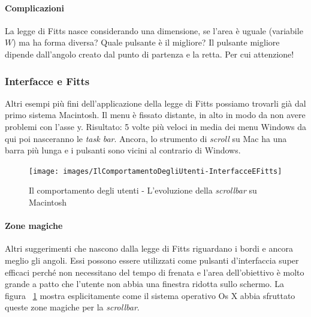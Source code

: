 				\paragraph{Complicazioni}
					La legge di Fitts nasce considerando una dimensione, se l'area è uguale (variabile $W$) ma ha forma diversa? Quale pulsante è il migliore? Il pulsante migliore dipende dall'angolo creato dal punto di partenza e la retta. Per cui attenzione!
					
			\subsubsection{Interfacce e Fitts}
				Altri esempi più fini dell'applicazione della legge di Fitts possiamo trovarli già dal primo sistema Macintosh. Il menu è fissato distante, in alto in modo da non avere problemi con l'asse y. Risultato: 5 volte più veloci in media dei menu Windows da qui poi nasceranno le \emph{task bar}. Ancora, lo strumento di \emph{scroll} su Mac ha una barra più lunga e i pulsanti sono vicini al contrario di Windows.
				
					\begin{figure} [h]
						\centering
						\texttt{[image: images/IlComportamentoDegliUtenti-InterfacceEFitts]}
						\caption[Il comportamento degli utenti - Evoluzione \emph{scrollbar} su Mac]{Il comportamento degli utenti - L'evoluzione della \emph{scrollbar} su Macintosh}
						\label{fig:InterfacceEFitts}
					\end{figure}
				
				\paragraph{Zone magiche}
					Altri suggerimenti che nascono dalla legge di Fitts riguardano i bordi e ancora meglio gli angoli. Essi possono essere utilizzati come pulsanti d'interfaccia super efficaci perché non necessitano del tempo di frenata e l'area dell'obiettivo è molto grande a patto che l'utente non abbia una finestra ridotta sullo schermo. La figura ~\ref{fig:InterfacceEFitts} mostra esplicitamente come il sistema operativo Os X abbia sfruttato queste zone magiche per la \emph{scrollbar}. 
				
